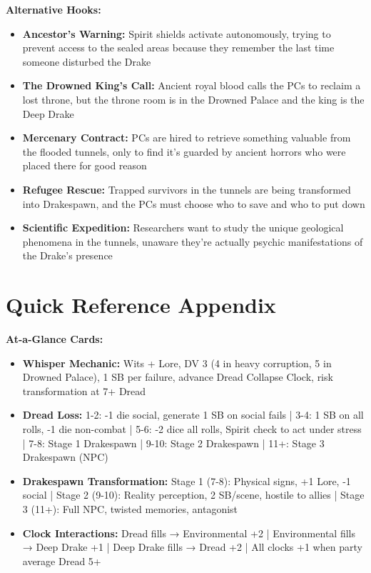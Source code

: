 \documentclass[11pt]{article}
\begin{document}
\textbf{Alternative Hooks:}
\begin{itemize}
\item \textbf{Ancestor's Warning:} Spirit shields activate autonomously, trying to prevent access to the sealed areas because they remember the last time someone disturbed the Drake
\item \textbf{The Drowned King's Call:} Ancient royal blood calls the PCs to reclaim a lost throne, but the throne room is in the Drowned Palace and the king is the Deep Drake
\item \textbf{Mercenary Contract:} PCs are hired to retrieve something valuable from the flooded tunnels, only to find it's guarded by ancient horrors who were placed there for good reason
\item \textbf{Refugee Rescue:} Trapped survivors in the tunnels are being transformed into Drakespawn, and the PCs must choose who to save and who to put down
\item \textbf{Scientific Expedition:} Researchers want to study the unique geological phenomena in the tunnels, unaware they're actually psychic manifestations of the Drake's presence
\end{itemize}

\section{Quick Reference Appendix}

\textbf{At-a-Glance Cards:}
\begin{itemize}
\item \textbf{Whisper Mechanic:} Wits + Lore, DV 3 (4 in heavy corruption, 5 in Drowned Palace), 1 SB per failure, advance Dread Collapse Clock, risk transformation at 7+ Dread
\item \textbf{Dread Loss:} 1-2: -1 die social, generate 1 SB on social fails | 3-4: 1 SB on all rolls, -1 die non-combat | 5-6: -2 dice all rolls, Spirit check to act under stress | 7-8: Stage 1 Drakespawn | 9-10: Stage 2 Drakespawn | 11+: Stage 3 Drakespawn (NPC)
\item \textbf{Drakespawn Transformation:} Stage 1 (7-8): Physical signs, +1 Lore, -1 social | Stage 2 (9-10): Reality perception, 2 SB/scene, hostile to allies | Stage 3 (11+): Full NPC, twisted memories, antagonist
\item \textbf{Clock Interactions:} Dread fills → Environmental +2 | Environmental fills → Deep Drake +1 | Deep Drake fills → Dread +2 | All clocks +1 when party average Dread 5+
\end{itemize}
\end{document}
